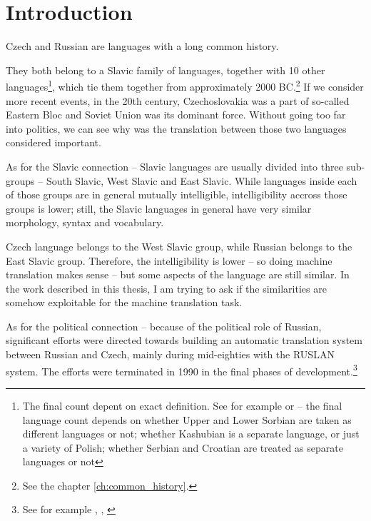 \chapter*{Introduction}

Czech and Russian are languages with a long common history.

They both belong to a Slavic family of languages, together with 10 other languages\footnote{The final count depent on exact definition. See for example \cite{sussex2011slavic} or \cite{siewierska1998overview} --  the final language count depends on whether Upper and Lower Sorbian are taken as different languages or not; whether Kashubian is a separate language, or just a variety of Polish; whether Serbian and Croatian are treated as separate languages or not},
which tie them together from approximately 2000 BC.\footnote{See the chapter \ref{ch:common_history}.}
If we consider more recent events, in the 20th century, Czechoslovakia was a part of so-called Eastern Bloc and Soviet Union was its dominant force. Without going too far into politics, we can see why was the translation between those two languages considered important.

As for the Slavic connection -- Slavic languages are usually divided into three sub-groups -- South Slavic, West Slavic and East Slavic. While languages inside each of those groups are in general mutually intelligible, intelligibility accross those groups is lower; still, the Slavic languages in general have very similar morphology, syntax and vocabulary. 

Czech language belongs to the West Slavic group, while Russian belongs to the East Slavic group. Therefore, the intelligibility is lower -- so doing machine translation makes sense -- but some aspects of the language are still similar. In the work described in this thesis, I am trying to ask if the similarities are somehow exploitable for the machine translation task.


As for the political connection -- because of the 
political role of Russian,
 significant efforts were directed towards building an automatic translation system between Russian and Czech, mainly during mid-eighties with the RUSLAN system. The efforts were terminated in 1990 in the final phases of development.\footnote{See for example \cite{recycled}, \cite{hajic1987}, \cite{olivaruslan}} 

